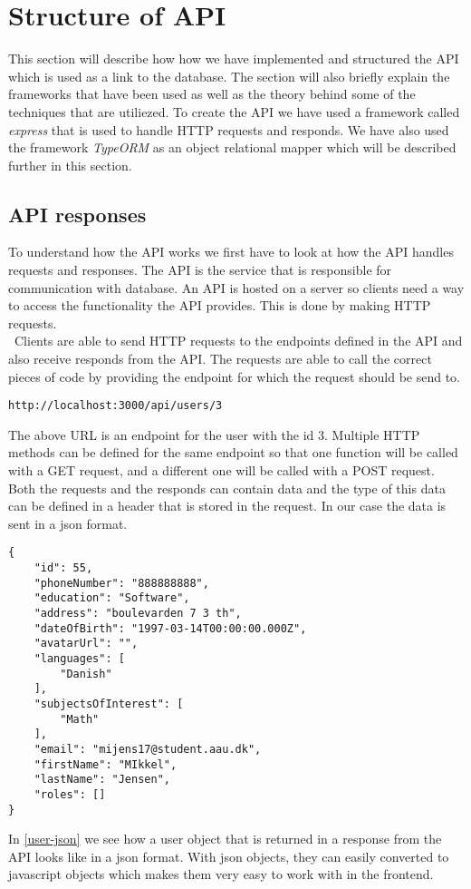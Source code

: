 \section{Structure of API}
This section will describe how how we have implemented and structured the API which is used as a link to the database.
The section will also briefly explain the frameworks that have been used as well as the theory behind some of the techniques that are utiliezed.
To create the API we have used a framework called \textit{express} that is used to handle HTTP requests and responds.
We have also used the framework \textit{TypeORM} as an object relational mapper which will be described further in this section.

\subsection{API responses}
To understand how the API works we first have to look at how the API handles requests and responses.
The API is the service that is responsible for communication with database. 
An API is hosted on a server so clients need a way to access the functionality the API provides.
This is done by making HTTP requests. 
\\\
Clients are able to send HTTP requests to the endpoints defined in the API and also receive responds from the API.
The requests are able to call the correct pieces of code by providing the endpoint for which the request should be send to.
\begin{center}\label{endpoint-example}
    \texttt{http://localhost:3000/api/users/3}
\end{center}
The above URL is an endpoint for the user with the id 3.
Multiple HTTP methods can be defined for the same endpoint so that one function will be called with a GET request, and a different one will be called with a POST request. 
Both the requests and the responds can contain data and the type of this data can be defined in a header that is stored in the request.
In our case the data is sent in a json format.
\begin{lstlisting}[caption={Shows how a user object looks in a json format}, captionpos=b, label={user-json}]
{
    "id": 55,
    "phoneNumber": "888888888",
    "education": "Software",
    "address": "boulevarden 7 3 th",
    "dateOfBirth": "1997-03-14T00:00:00.000Z",
    "avatarUrl": "",
    "languages": [
        "Danish"
    ],
    "subjectsOfInterest": [
        "Math"
    ],
    "email": "mijens17@student.aau.dk",
    "firstName": "MIkkel",
    "lastName": "Jensen",
    "roles": []
}
\end{lstlisting}
In \autoref{user-json} we see how a user object that is returned in a response from the API looks like in a json format. 
With json objects, they can easily converted to javascript objects which makes them very easy to work with in the frontend. 

